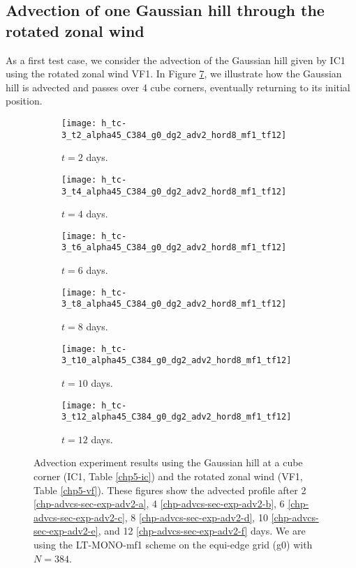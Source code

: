 \subsection{Advection of one Gaussian hill through the rotated zonal wind}
As a first test case, we consider the advection of the Gaussian hill given by IC1 using 
the rotated zonal wind VF1.
In Figure \ref{chp-advcs-sec-exp-adv2}, we illustrate how the Gaussian hill is advected and passes over 4 cube corners, 
eventually returning to its initial position. 
\begin{figure}[!htb]
	\centering
	\begin{subfigure}{0.45\textwidth}
		\centering
		\texttt{[image: h\_tc-3\_t2\_alpha45\_C384\_g0\_dg2\_adv2\_hord8\_mf1\_tf12]}
		\caption{$t=2$ days.\label{chp-advcs-sec-exp-adv2-a}}
	\end{subfigure}
	\begin{subfigure}{0.45\textwidth}
		\centering
		\texttt{[image: h\_tc-3\_t4\_alpha45\_C384\_g0\_dg2\_adv2\_hord8\_mf1\_tf12]}
		\caption{$t=4$ days.\label{chp-advcs-sec-exp-adv2-b}}
	\end{subfigure}

	\begin{subfigure}{0.45\textwidth}
		\centering
		\texttt{[image: h\_tc-3\_t6\_alpha45\_C384\_g0\_dg2\_adv2\_hord8\_mf1\_tf12]}
		\caption{$t=6$ days.\label{chp-advcs-sec-exp-adv2-c}}
	\end{subfigure}	
	\begin{subfigure}{0.45\textwidth}
		\centering
		\texttt{[image: h\_tc-3\_t8\_alpha45\_C384\_g0\_dg2\_adv2\_hord8\_mf1\_tf12]}
		\caption{$t=8$ days.\label{chp-advcs-sec-exp-adv2-d}}
	\end{subfigure}

	\begin{subfigure}{0.45\textwidth}
		\centering
		\texttt{[image: h\_tc-3\_t10\_alpha45\_C384\_g0\_dg2\_adv2\_hord8\_mf1\_tf12]}
		\caption{$t=10$ days.\label{chp-advcs-sec-exp-adv2-e}}
	\end{subfigure}
	\begin{subfigure}{0.45\textwidth}
		\centering
		\texttt{[image: h\_tc-3\_t12\_alpha45\_C384\_g0\_dg2\_adv2\_hord8\_mf1\_tf12]}
		\caption{$t=12$ days.\label{chp-advcs-sec-exp-adv2-f}}
	\end{subfigure}
	\caption{Advection experiment results using the Gaussian hill at a cube corner (IC1, Table \ref{chp5-ic}) and 
		the rotated zonal wind (VF1, Table \ref{chp5-vf}).
		These figures show the advected profile after
		2 \eqref{chp-advcs-sec-exp-adv2-a}, 
		4  \eqref{chp-advcs-sec-exp-adv2-b},
		6  \eqref{chp-advcs-sec-exp-adv2-c},
		8  \eqref{chp-advcs-sec-exp-adv2-d},
		10  \eqref{chp-advcs-sec-exp-adv2-e},
		and 12  \eqref{chp-advcs-sec-exp-adv2-f} days.
		We are using the LT-MONO-mf1 scheme on the equi-edge grid (g0) with $N=384$. \label{chp-advcs-sec-exp-adv2}}
\end{figure}

